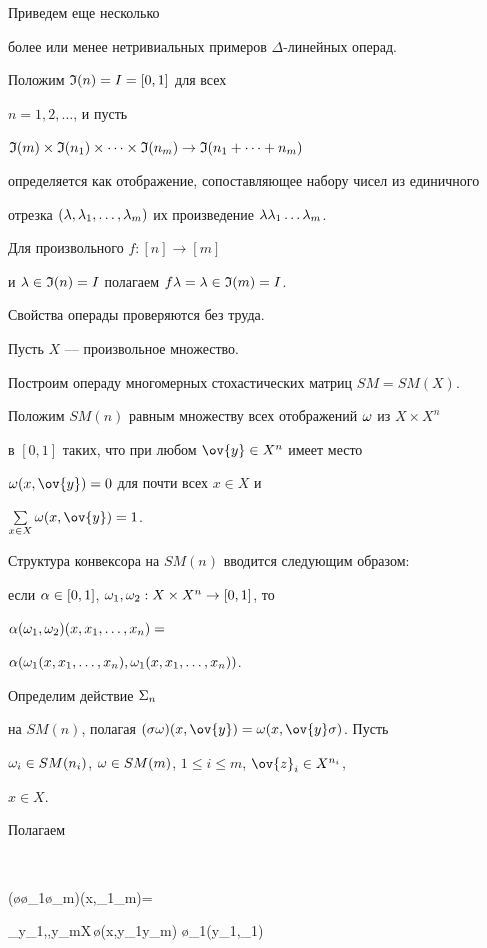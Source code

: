 Приведем еще несколько


более или менее нетривиальных примеров $\Delta$-линейных операд.


Положим $\frak I(n)=I=[0,1]$ для всех


$n=1,2,\dotsc$, и пусть


$\frak I(m)\times \frak I(n_1)\times \dotsb \times \frak I(n_m)\to \frak I(n_1+\dotsb +n_m)$


определяется как отображение, сопоставляющее набору чисел из единичного


отрезка $(\lambda,\lambda_1,\dots,\lambda_m)$ их произведение $\lambda\lambda_1\dots\lambda_m$.


Для произвольного $f:[n]\to [m]$


и $\lambda\in \frak I(n)=I$ полагаем $f\lambda=\lambda\in \frak I(m)=I$.


Свойства операды проверяются без труда.








Пусть $X$ --- произвольное множество.


Построим операду многомерных стохастических матриц $SM=SM(X)$.


Положим $SM(n)$ равным множеству всех отображений $\omega$ из $X\times X^n$


в $[0,1]$ таких, что при любом $\ov{y}\in X^n$ имеет место


$\o(x,\ov{y})=0$ для почти всех $x\in X$ и


$\sum\limits_{x\in X} \o(x,\ov{y})=1$.


Структура конвексора на $SM(n)$ вводится следующим образом:


если $\alpha\in [0,1]$, $\omega_1,\omega_2:X\times X^n\to [0,1]$, то


$\alpha(\omega_1,\omega_2)(x,x_1,\dotsc,x_n)=$


$\alpha(\omega_1(x,x_1,\dotsc,x_n),\omega_1(x,x_1,\dotsc,x_n))$.


Определим действие $\Sigma_n$


на $SM(n)$, полагая $(\s\o)(x,\ov{y})=\o(x,\ov{y}\s)$. Пусть


$\omega_i\in SM(n_i)$, $\omega\in SM(m)$, $1\le i \le m$, $\ov{z}_i \in X^{n_i}$,


$x\in X$.


Полагаем


$$


(\o\o_1\dotsc\o_m)(x,_1\dotsc{}_m)=


\sum_{y_1,\dotsc,y_m\in X}\,\o(x,y_1\dotsc y_m) \o_1(y_1,_1)\dotsc


